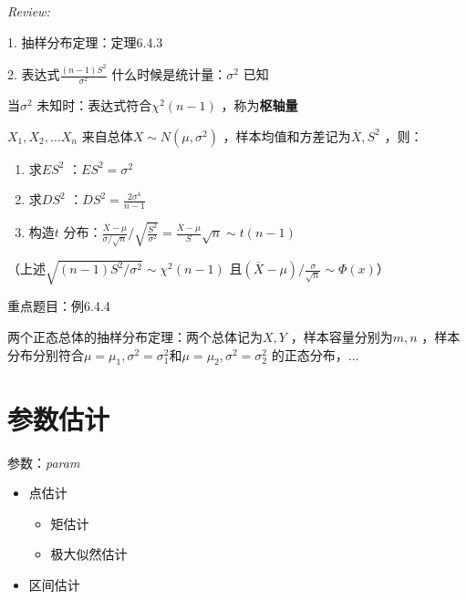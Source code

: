 \textit{Review:}

1. 抽样分布定理：定理6.4.3

2. 表达式$\frac{\left( n-1 \right)S^2 }{\sigma^2 }$ 什么时候是统计量：$\sigma^2 $ 已知

当$\sigma^2 $ 未知时：表达式符合$\chi^2 \left( n-1 \right)$ ，称为\textbf{枢轴量}
\begin{cor}
    $X_1,X_2,\ldots X_{n}$ 来自总体$X\sim N\left( \mu,\sigma^2  \right)$ ，样本均值和方差记为$\overline{X},S^2 $ ，则：
    \begin{enumerate}
        \item 求$ES^2 $ ：$ES^2 =\sigma^2 $ 
        \item 求$DS^2 $ ：$DS^2 =\frac{2\sigma^4 }{n-1}$
        \item 构造$t$ 分布：$\frac{\overline{X}-\mu}{\sigma /\sqrt{n}}/\sqrt{\frac{S^2 }{\sigma^2 }}=\frac{\overline{X}-\mu}{S}\sqrt{n}\sim t\left( n-1 \right)$
    \end{enumerate}
    （上述$\sqrt{\left( n-1 \right)S^2 /\sigma^2} \sim \chi^2 \left( n-1 \right)$ 且$(\overline{X}-\mu) /\frac{\sigma}{\sqrt{n}}\sim \Phi\left( x \right)$）
\end{cor}
重点题目：例6.4.4
\begin{cor}
    两个正态总体的抽样分布定理：两个总体记为$X,Y$ ，样本容量分别为$m,n$ ，样本分布分别符合$\mu=\mu_1,\sigma^2 =\sigma_1^2 $和$\mu=\mu_2,\sigma^2 =\sigma_2^2 $ 的正态分布，$\ldots $
\end{cor}
\section{参数估计}%
\label{sec:参数估计}
参数：\textit{param}
\begin{itemize}
    \item 点估计
    \begin{itemize}
        \item 矩估计
        \item 极大似然估计
    \end{itemize}
    \item 区间估计
\end{itemize} 
